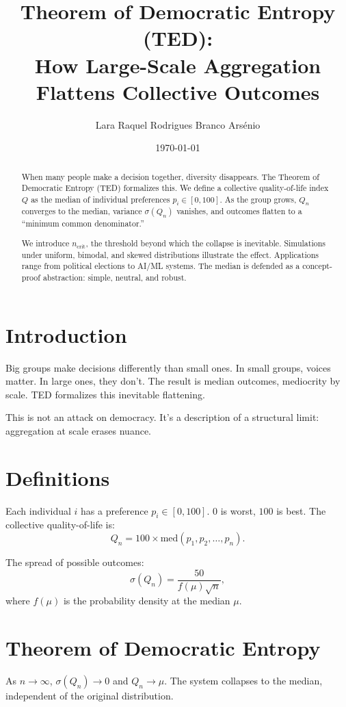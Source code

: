 \documentclass[12pt]{article}
\title{Theorem of Democratic Entropy (TED): \\
How Large-Scale Aggregation Flattens Collective Outcomes}
\author{Lara Raquel Rodrigues Branco Arsénio}
\date{\today}
\begin{document}
\maketitle

\begin{abstract}
When many people make a decision together, diversity disappears. 
The Theorem of Democratic Entropy (TED) formalizes this. We define 
a collective quality-of-life index $Q$ as the median of individual 
preferences $p_i \in [0,100]$. As the group grows, $Q_n$ converges 
to the median, variance $\sigma(Q_n)$ vanishes, and outcomes 
flatten to a “minimum common denominator.” 

We introduce $n_{\text{crit}}$, the threshold beyond which the collapse 
is inevitable. Simulations under uniform, bimodal, and skewed 
distributions illustrate the effect. Applications range from 
political elections to AI/ML systems. The median is defended as a 
concept-proof abstraction: simple, neutral, and robust.
\end{abstract}

\section{Introduction}
Big groups make decisions differently than small ones. In small 
groups, voices matter. In large ones, they don't. The result is 
median outcomes, mediocrity by scale. TED formalizes this 
inevitable flattening. 

This is not an attack on democracy. It's a description of a structural 
limit: aggregation at scale erases nuance.

\section{Definitions}
Each individual $i$ has a preference $p_i \in [0,100]$. 
$0$ is worst, $100$ is best. The collective quality-of-life is:
\[
Q_n = 100 \times \mathrm{med}(p_1, p_2, \dots, p_n).
\]

The spread of possible outcomes:
\[
\sigma(Q_n) = \frac{50}{f(\mu)\sqrt{n}},
\]
where $f(\mu)$ is the probability density at the median $\mu$.

\section{Theorem of Democratic Entropy}
\begin{theorem}[TED]
As $n \to \infty$, $\sigma(Q_n) \to 0$ and $Q_n \to \mu$. 
The system collapses to the median, independent of the original 
distribution.
\end{theorem}
\end{document}

